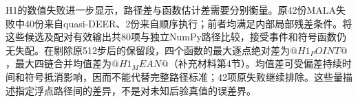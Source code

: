 H1的数值失败进一步显示，路径差与函数估计差需要分别衡量。原42份MALA失败中40份来自quasi-DEER、2份来自顺序执行；前者均满足内部局部残差条件。将这些候选及配对有效输出共80项与独立NumPy路径比较，接受事件和符号函数仍无失配。在剔除原512步后的保留段，四个函数的最大逐点绝对差为$@H1_POINT@$，最大四链合并均值差为$@H1_MEAN@$（补充材料第4节）。均值差可受偏差持续时间和符号抵消影响，因而不能代替完整路径标准；42项原失败继续排除。这些量描述指定浮点路径间的差异，不是对未知后验真值的误差界。
